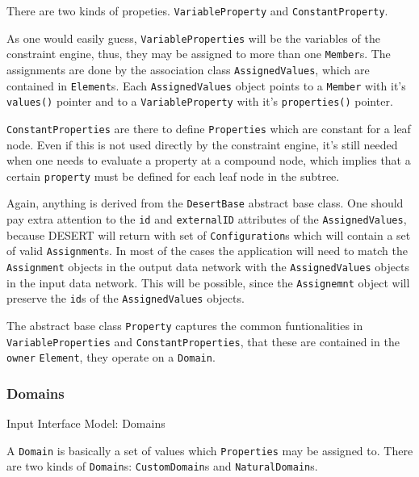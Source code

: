 \documentclass{article}
\begin{document}
{\par There are two kinds of propeties. {\tt VariableProperty} and {\tt ConstantProperty}. }
{\par As one would easily guess, {\tt VariableProperties} will be the variables of the constraint engine, thus, they may be assigned to more than one {\tt Member}s. The assignments are done by the association class {\tt AssignedValues}, which are contained in {\tt Element}s. Each {\tt AssignedValues} object points to a {\tt Member} with it's {\tt values()} pointer and to a {\tt VariableProperty} with it's {\tt properties()} pointer. 
}
{\par {\tt ConstantProperties} are there to define {\tt Properties} which are constant for a leaf node. Even if this is not used directly by the constraint engine, it's still needed when one needs to evaluate a property at a compound node, which implies that a certain {\tt property} must be defined for each leaf node in the subtree.
}
{\par Again, anything is derived from the {\tt DesertBase} abstract base class. One should pay extra attention to the {\tt id} and {\tt externalID} attributes of the {\tt AssignedValues}, because DESERT will return with set of {\tt Configuration}s which will contain a set of valid {\tt Assignment}s. In most of the cases the application will need to match the {\tt Assignment} objects in the output data network with the {\tt AssignedValues} objects in the input data network. This will be possible, since the {\tt Assignemnt} object will preserve the {\tt id}s of the {\tt AssignedValues} objects. 
}
{\par The abstract base class {\tt Property} captures the common funtionalities in {\tt VariableProperties} and {\tt ConstantProperties}, that these are contained in the {\tt owner} {\tt Element}, they operate on a {\tt Domain}.}

\subsubsection{Domains}
\label{dom}
\vspace{1cm}
\begin{center}
{\par
Input Interface Model: Domains}
\end{center}
\vspace{1cm}
{\par A {\tt Domain} is basically a set of values which {\tt Properties} may be assigned to. There are two kinds of {\tt Domain}s: {\tt CustomDomain}s and {\tt NaturalDomain}s.
}
\end{document}
